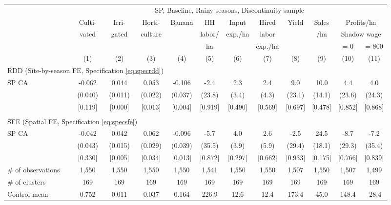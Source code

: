 \begin{tabular}{lccccccccccc}
\hline \hline
 & \multicolumn{11}{c}{SP, Baseline, Rainy seasons, Discontinuity sample} \\
\cmidrule(lr){2-12}
 & Culti- & Irri- & Horti- & Banana & HH & Input & Hired & Yield & Sales & \multicolumn{2}{c}{Profits/ha} \\
 & vated & gated & culture & & labor/ & exp./ha & labor & & /ha & \multicolumn{2}{c}{Shadow wage} \\
 & & & & & ha & & exp./ha & & & = 0 & = 800 \\
\cmidrule(lr){2-2}\cmidrule(lr){3-3}\cmidrule(lr){4-4}\cmidrule(lr){5-5}\cmidrule(lr){6-6}\cmidrule(lr){7-7}\cmidrule(lr){8-8}\cmidrule(lr){9-9}\cmidrule(lr){10-10}\cmidrule(lr){11-11}\cmidrule(lr){12-12}
 & (1) & (2) & (3) & (4) & (5) & (6) & (7) & (8) & (9) & (10) & (11) \\
\hline
\multicolumn{4}{l}{RDD (Site-by-season FE, Specification \ref{eq:specrdd})} & & & & & & & & \\
\cmidrule(lr){1-4}
SP CA & -0.062\hphantom{-} & 0.044 & 0.053 & -0.106\hphantom{-} & -2.4\hphantom{-} & 2.3 & 2.4 & 9.0 & 10.0 & 4.4 & 4.0 \\
 & (0.040) & (0.011) & (0.022) & (0.037) & (23.8) & (3.4) & (4.3) & (23.1) & (14.1) & (23.6) & (24.3) \\
 & [0.119] & [0.000] & [0.013] & [0.004] & [0.919] & [0.490] & [0.569] & [0.697] & [0.478] & [0.852] & [0.868] \\
\\[-0.5em]
\multicolumn{4}{l}{SFE (Spatial FE, Specification \ref{eq:specsfe})} & & & & & & & & \\
\cmidrule(lr){1-4}
SP CA & -0.042\hphantom{-} & 0.042 & 0.062 & -0.096\hphantom{-} & -5.7\hphantom{-} & 4.0 & 2.6 & -2.5\hphantom{-} & 24.5 & -8.7\hphantom{-} & -7.2\hphantom{-} \\
 & (0.043) & (0.015) & (0.029) & (0.039) & (35.5) & (3.9) & (5.9) & (29.4) & (18.1) & (29.3) & (35.4) \\
 & [0.330] & [0.005] & [0.034] & [0.013] & [0.872] & [0.297] & [0.662] & [0.933] & [0.175] & [0.766] & [0.839] \\
\hline
\# of observations & 1,550 & 1,550 & 1,550 & 1,550 & 1,541 & 1,550 & 1,550 & 1,507 & 1,550 & 1,507 & 1,499 \\
\# of clusters & 169 & 169 & 169 & 169 & 169 & 169 & 169 & 169 & 169 & 169 & 169 \\
Control mean & 0.752 & 0.011 & 0.037 & 0.164 & 226.9 & 12.6 & 12.4 & 173.4 & 45.0 & 148.4 & -28.4 \\
\hline
\end{tabular}
